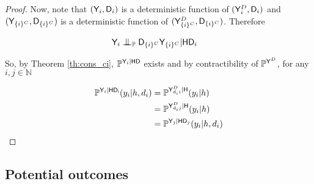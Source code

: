 \begin{proof}
Now, note that $(\mathsf{Y}_i,\mathsf{D}_i)$ is a deterministic function of $(\mathsf{Y}^D_{i},\mathsf{D}_i)$ and $(\mathsf{Y}_{\{i\}^C},\mathsf{D}_{\{i\}^C})$ is a deterministic function of $(\mathsf{Y}^D_{\{i\}^C},\mathsf{D}_{\{i\}^C})$. Therefore

\begin{align}
    &\RV{Y}_i \CI_{\prob{P}} \RV{D}_{\{i\}^C}\RV{Y}_{\{i\}^C} |\RV{H}\RV{D}_i&
\end{align}

So, by Theorem \ref{th:cons_ci}, $\mathbb{P}^{\mathsf{Y}_i|\mathsf{HD}}$ exists and by contractibility of $\mathbb{P}^{\mathsf{Y}^D}$, for any $i,j\in\mathbb{N}$

\begin{align}
    \mathbb{P}^{\mathsf{Y}_i|\mathsf{HD_i}}(y_i|h,d_i) &= \mathbb{P}^{\mathsf{Y}^D_{d_i i}|\mathsf{H}}(y_i|h) \\
    &= \mathbb{P}^{\mathsf{Y}^D_{d_i j}|\mathsf{H}}(y_i|h)\\
    &= \mathbb{P}^{\mathsf{Y}_j|\mathsf{HD}_j}(y_i|h,d_i)
\end{align}
\end{proof}

\subsection{Potential outcomes}

